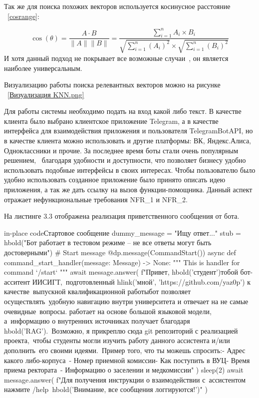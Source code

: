 Так же для поиска похожих векторов используется косинусное расстояние
~\ref{cosrange}:

\begin{equation} \label{cosrange}
    \cos(\theta) = \frac{A \cdot B}{\| A\| \|B\|} = 
    \frac{\sum_{i=1}^{n}A_i \times B_i}{\sqrt{\sum_{i=1}^{n}(A_i)^2}
    \times \sqrt{\sum_{i=1}^{n}(B_i)^2}}
\end{equation}
И хотя данный подход не покрывает все возможные случаи~\cite{leven}, он
является наиболее универсальным.

Визуализацию работы поиска релевантных векторов можно на рисунке
~\ref{Визуализация KNN.png}


Для работы системы необходимо подать на вход какой либо текст.
В качестве клиента было выбрано клиентское приложение Telegram, а в качестве
интерфейса для взаимодействия приложения и пользователя TelegramBotAPI, но
в качестве клиента можно использовать и другие платформы: ВК, Яндекс.Алиса,
Одноклассники и прочие. За последнее время боты стали очень популярным
решением,~\cite{bots} благодаря удобности и доступности, что позволяет
бизнесу удобно использовать подобные интерфейсы в своих интересах.
Чтобы пользователю было удобно использовать созданное приложение было
принято описать идею приложения, а так же дать ссылку на вызов
функции-помощника. Данный аспект отражает нефункциональные требования
NFR\_1 и NFR\_2.

На листинге 3.3 отображена реализация приветственного сообщения от бота.

\begin{codepiece}{in-place code}{Стартовое сообщение}
    dummy_message = "Ищу ответ..."
    stub = hbold("Бот работает в тестовом режиме – не все ответы могут быть достоверными")
    # Start message
    @dp.message(CommandStart())
    async def command_start_handler(message: Message) -> None:
        """
        This is handler for command `/start`
        """
        await message.answer(
            f"Привет, {hbold('студент')}\n{} тобой бот-асситент ИИСИГТ,\
     подготовленный {hlink('мной', 'https://github.com/yaz0p')} к качестве\
     выпускной квалификационной работы\n{} бот позволяет осуществлять\
     удобную навигацию внутри университета и отвечает на не самые очевидные\
     вопросы. \n{} работает на основе большой языковой модели, а\
     информацию о внутренних источниках получает благодаря {hbold('RAG')}.\
     Возможно, я прикреплю сюда git репозиторий с реализацией проекта,\
     чтобы студенты могли изучить работу данного ассистента и/или дополнить\
     его своими идеями.\n\n\
    Пример того, что ты можешь спросить:\n- Адрес какого либо-корпуса\n\
    - Номер приемной комиссии\n- Как поступить в ВУЦ\n- Время приема ректората\
     - Информацию о заселении и медкомиссии\n"
        )
        sleep(2)
        await message.answer(
            f"Для получения инструкции о взаимодействии с\
            ассистентом нажмите /help\n\n\
    {hbold('Внимание, все сообщения логгируются!')}"
        )
\end{codepiece}

